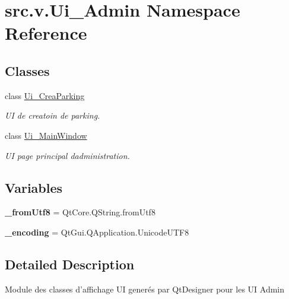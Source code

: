 \hypertarget{namespacesrc_1_1v_1_1_ui___admin}{}\section{src.\+v.\+Ui\+\_\+\+Admin Namespace Reference}
\label{namespacesrc_1_1v_1_1_ui___admin}
\subsection*{Classes}
\begin{DoxyCompactItemize}
\item 
class \hyperlink{classsrc_1_1v_1_1_ui___admin_1_1_ui___crea_parking}{Ui\+\_\+\+Crea\+Parking}
\begin{DoxyCompactList}\small\item\em U\+I de creatoin de parking. \end{DoxyCompactList}\item 
class \hyperlink{classsrc_1_1v_1_1_ui___admin_1_1_ui___main_window}{Ui\+\_\+\+Main\+Window}
\begin{DoxyCompactList}\small\item\em U\+I page principal d\textquotesingle{}administration. \end{DoxyCompactList}\end{DoxyCompactItemize}
\subsection*{Variables}
\begin{DoxyCompactItemize}
\item 
\hypertarget{namespacesrc_1_1v_1_1_ui___admin_a633d1054dfe28cd0b99b8014db2d5a35}{}{\bfseries \+\_\+from\+Utf8} = Qt\+Core.\+Q\+String.\+from\+Utf8\label{namespacesrc_1_1v_1_1_ui___admin_a633d1054dfe28cd0b99b8014db2d5a35}

\item 
\hypertarget{namespacesrc_1_1v_1_1_ui___admin_ac7793ccab5e345a719f11e02f65dfffb}{}{\bfseries \+\_\+encoding} = Qt\+Gui.\+Q\+Application.\+Unicode\+U\+T\+F8\label{namespacesrc_1_1v_1_1_ui___admin_ac7793ccab5e345a719f11e02f65dfffb}

\end{DoxyCompactItemize}


\subsection{Detailed Description}
\begin{DoxyVerb}    Module des classes d'affichage UI generés par QtDesigner pour les UI Admin
\end{DoxyVerb}
 